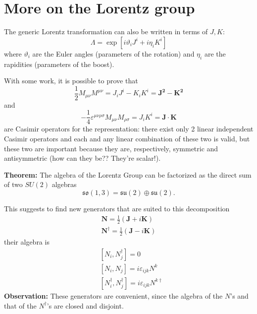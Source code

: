 \newpage
{}
\section{More on the Lorentz group}
The generic Lorentz transformation can also be written in terms of $J,K$:
$$\Lambda = \exp\left[i\vartheta_iJ^i+i\eta_iK^i\right]$$
where $\vartheta_i$ are the Euler angles (parameters of the rotation) and $\eta_i$
are the rapidities (parameters of the boost).

With some work, it is possible to prove that
$$\frac{1}{2}M_{\mu\nu}M^{\mu\nu} = J_iJ^i - K_iK^i = \mathbf{J^2}-\mathbf{K^2}$$
and
$$-\frac{1}{4} \varepsilon^{\mu\nu\rho\sigma}M_{\mu\nu}M_{\rho\sigma} = J_iK^i = 
\mathbf{J}\cdot\mathbf{K}$$
are Casimir operators for the representation: there exist only 2 linear independent
Casimir operators and each and any linear combination of these two is valid, but
these two are important because they are, respectively, symmetric and antisymmetric
(how can they be?? They're scalar!).

\textbf{Theorem:} The algebra of the Lorentz Group can be factorized as the direct
sum of two $SU(2)$ algebras
$$\mathfrak{so}(1,3) = \mathfrak{su}(2)\oplus\mathfrak{su}(2).$$

This suggests to find new generators that are suited to this decomposition
\begin{gather*}
\mathbf{N} = \frac{1}{2}\left(\mathbf{J}+i\mathbf{K}\right)\\
\mathbf{N}^\dagger = \frac{1}{2}\left(\mathbf{J}-i\mathbf{K}\right)
\end{gather*}
their algebra is
\begin{align*}
&\left[N_i,N_j^\dagger\right] = 0\\
&\left[N_i,N_j\right] = i\varepsilon_{ijk}N^k\\
&\left[N_i^\dagger,N_j^\dagger\right] = i\varepsilon_{ijk}N^{k\dagger}
\end{align*}
\textbf{Observation:} These generators are convenient, since the algebra
of the $N$'s and that of the $N^\dagger$'s are closed and disjoint.

